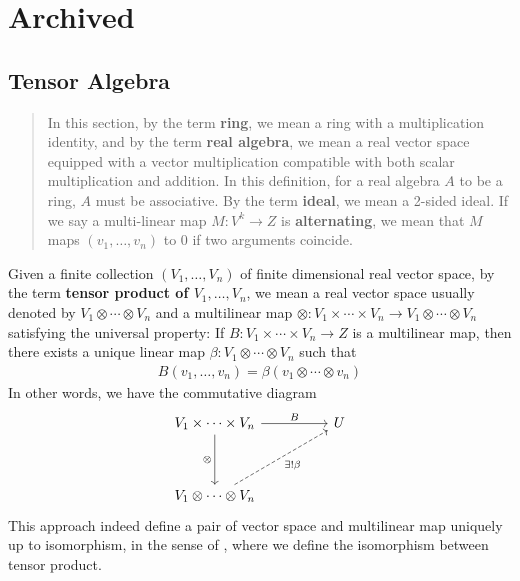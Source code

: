 \documentclass{report}
\begin{document}
\chapter{Archived}
\section{Tensor Algebra}
\begin{abstract}
In this section, by the term \textbf{ring}, we mean a ring with a multiplication identity, and by the term \textbf{real algebra}, we mean a real vector space equipped with a vector multiplication compatible with both scalar multiplication and addition. In this definition, for a real algebra $A$ to be a ring, $A$ must be associative.  By the term \textbf{ideal}, we mean a 2-sided ideal. If we say a multi-linear map $M:V^k\rightarrow Z$ is \textbf{alternating}, we mean that $M$ maps $(v_1,\dots ,v_n)$ to $0$ if two arguments coincide.
\end{abstract}
\begin{mdframed}
Given a finite collection $(V_1,\dots ,V_n)$ of finite dimensional real vector space, by the term \textbf{tensor product of $V_1,\dots ,V_n$}, we mean a real vector space  usually denoted by $V_1 \otimes \cdots \otimes  V_n$ and a multilinear map  $\otimes  : V_1 \times \cdots \times V_n \rightarrow V_1 \otimes  \cdots \otimes  V_n$ satisfying the universal property: If $B:V_1 \times \cdots \times V_n\rightarrow Z$ is a multilinear map, then there exists a unique linear map $\beta :V_1\otimes \cdots \otimes  V_n$ such that 
\begin{align*}
B(v_1,\dots ,v_n)=\beta (v_1\otimes \cdots \otimes  v_n)
\end{align*}
In other words, we have the commutative diagram
\[\begin{tikzcd}
	{V_1\times \cdots \times V_n} && U \\
	\\
	{V_1 \otimes \cdots \otimes   V_n}
	\arrow["B", from=1-1, to=1-3] 
	\arrow["{\otimes }"', from=1-1, to=3-1]
	\arrow["{\exists! \beta}"', dashed, from=3-1, to=1-3]
\end{tikzcd}\]
This approach indeed define a pair of vector space and multilinear map uniquely up to isomorphism, in the sense of , where we define the isomorphism between tensor product. 
\end{mdframed}
\end{document}
